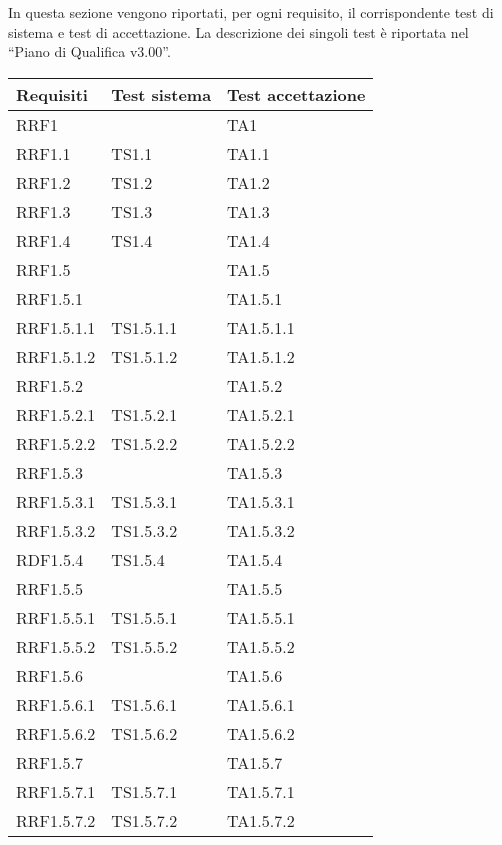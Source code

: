 	In questa sezione vengono riportati, per ogni requisito, il corrispondente test di sistema e test di accettazione.
La descrizione dei singoli test è riportata nel “Piano di Qualifica v3.00”.

	\begin{longtabu}{| X | X | X |}

			\hline
			\rowfont{\bf}
			Requisiti	&	Test sistema	&	Test accettazione \\ \hline 
			\endhead

				RRF1 	&		&	TA1	\\ \hline
				RRF1.1 	&	TS1.1	&	TA1.1 	\\ \hline
				RRF1.2 	&	TS1.2	&	TA1.2 	\\ \hline
				RRF1.3 	&	TS1.3 	&	TA1.3 	\\ \hline
				RRF1.4 	&	TS1.4 	&	TA1.4 	\\ \hline
				RRF1.5 	&		&	TA1.5 	\\ \hline
				RRF1.5.1 	&		&	TA1.5.1 	\\ \hline
				RRF1.5.1.1 	&	TS1.5.1.1 	&	TA1.5.1.1 	\\ \hline
				RRF1.5.1.2 	&	TS1.5.1.2 	&	TA1.5.1.2 	\\ \hline
				RRF1.5.2 	&		&	TA1.5.2 	\\ \hline
				RRF1.5.2.1 	&	TS1.5.2.1 	&	TA1.5.2.1 	\\ \hline
				RRF1.5.2.2 	&	TS1.5.2.2 	&	TA1.5.2.2 	\\ \hline
				RRF1.5.3 	&		&	TA1.5.3 	\\ \hline
				RRF1.5.3.1 	&	TS1.5.3.1 	&	TA1.5.3.1 	\\ \hline
				RRF1.5.3.2 	&	TS1.5.3.2 	&	TA1.5.3.2 	\\ \hline
				RDF1.5.4 	&	TS1.5.4 	&	TA1.5.4 	\\ \hline
				RRF1.5.5 	&		&	TA1.5.5 	\\ \hline
				RRF1.5.5.1 	&	TS1.5.5.1 	&	TA1.5.5.1 	\\ \hline
				RRF1.5.5.2 	&	TS1.5.5.2 	&	TA1.5.5.2 	\\ \hline
				RRF1.5.6 	&		&	TA1.5.6 	\\ \hline
				RRF1.5.6.1 	&	TS1.5.6.1 	&	TA1.5.6.1 	\\ \hline
				RRF1.5.6.2 	&	TS1.5.6.2 	&	TA1.5.6.2 	\\ \hline
				RRF1.5.7 	&		&	TA1.5.7 	\\ \hline
				RRF1.5.7.1 	&	TS1.5.7.1 	&	TA1.5.7.1 	\\ \hline
				RRF1.5.7.2 	&	TS1.5.7.2 	&	TA1.5.7.2 	\\ \hline

\end{longtabu}
